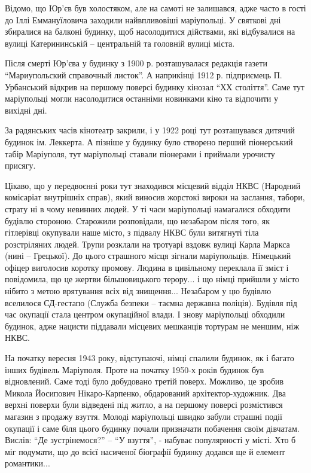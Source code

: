 Відомо, що Юр'єв був холостяком, але на самоті не залишався, адже часто в гості
до Іллі Еммануїловича заходили найвпливовіші маріупольці. У святкові дні
збиралися на балконі будинку, щоб насолодитися дійствами, які відбувалися на
вулиці Катерининській – центральній та головній вулиці міста.

Після смерті Юр'єва у будинку з 1900 р. розташувалася редакція газети
\enquote{Мариупольский справочный листок}. А наприкінці 1912 р. підприємець П.
Урбанський відкрив на першому поверсі будинку кінозал \enquote{ХХ століття}. Саме тут
маріупольці могли насолодитися останніми новинками кіно та відпочити у вихідні
дні.

За радянських часів кінотеатр закрили, і у 1922 році тут розташувався  дитячий
будинок ім. Леккерта. А пізніше у будинку було створено перший піонерський
табір Маріуполя, тут маріупольці ставали піонерами і приймали урочисту присягу.

Цікаво, що у передвоєнні роки тут знаходився місцевий відділ НКВС (Народний
комісаріат внутрішніх справ), який виносив жорстокі вироки на заслання, табори,
страту ні в чому невинних людей. У ті часи маріупольці намагалися обходити
будівлю стороною. Старожили розповідали, що незабаром після того, як гітлерівці
окупували наше місто, з підвалу НКВС були витягнуті тіла розстріляних людей.
Трупи розклали на тротуарі вздовж вулиці Карла Маркса (нині – Грецької). До
цього страшного місця зігнали маріупольців. Німецький офіцер виголосив коротку
промову. Людина в цивільному переклала її зміст і повідомила, що це жертви
більшовицького терору... і що німці прийшли у місто нібито з метою врятування
всіх від знищення... Незабаром у цю будівлю вселилося СД-гестапо (Служба безпеки
– таємна державна поліція). Будівля під час окупації стала центром окупаційної
влади. І знову маріупольці обходили будинок, адже нацисти піддавали місцевих
мешканців тортурам не меншим, ніж НКВС.

На початку вересня 1943 року, відступаючі, німці спалили будинок, як і багато
інших будівель Маріуполя. Проте на початку 1950-х років будинок був
відновлений. Саме тоді було добудовано третій поверх. Можливо, це зробив Микола
Йосипович Нікаро-Карпенко, обдарований архітектор-художник. Два верхні поверхи
були відведені під житло, а на першому поверсі розмістився магазин з продажу
взуття. Молоді маріупольці швидко забули страшні події окупації і саме біля
цього будинку почали призначати побачення своїм дівчатам. Вислів: \enquote{Де
зустрінемося?} – \enquote{У взуття}, - набуває популярності у місті. Хто б міг подумати,
що до всієї насиченої біографії будинку додався ще й елемент романтики... 

